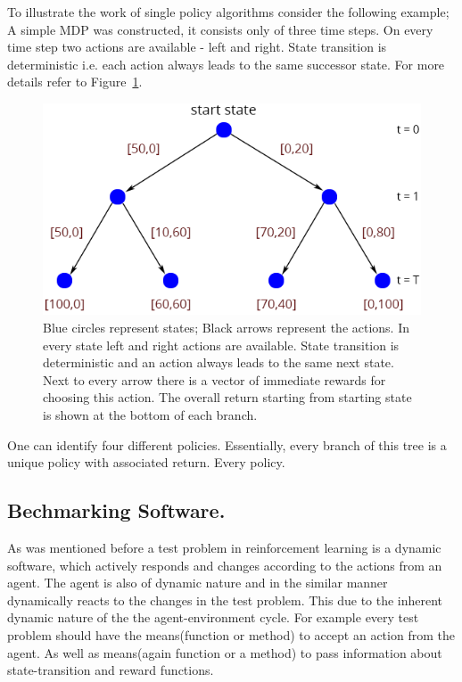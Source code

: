 To illustrate the work of single policy algorithms consider the following example; A simple MDP was constructed, it consists only of three time steps. On every time step two actions are available - left and right. State transition is deterministic i.e. each action always leads to the same successor state. For more details refer to Figure~\ref{fig:decisionTree}.

\begin{figure}[ht]
\centering
\includegraphics[scale=0.6]{decisionTree.png}
\caption{Blue circles represent states; Black arrows represent the actions. In every state left and right actions are available. State transition is deterministic and an action always leads to the same next state. Next to every arrow there is a vector of immediate rewards for choosing this action. The overall return starting from starting state is shown at the bottom of each branch.}
\label{fig:decisionTree}
\end{figure}

One can identify four different policies. Essentially, every branch of this tree is a unique policy with associated return. Every policy.

\subsection{Bechmarking Software.}
As was mentioned before a test problem in reinforcement learning is a dynamic software, which actively responds and changes according to the actions from an agent. The agent is also of dynamic nature and in the similar manner dynamically reacts to the changes in the test problem. This due to the inherent dynamic nature of the the agent-environment cycle. For example every test problem should have the means(function or method) to accept an action from the agent. As well as means(again function or a method) to pass information about state-transition and reward functions. \\

